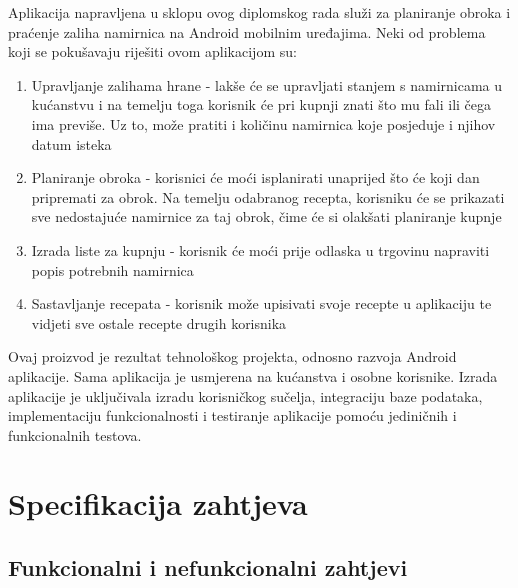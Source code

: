 \documentclass[diplomskirad]{fer}
\begin{document}
Aplikacija napravljena u sklopu ovog diplomskog rada služi za planiranje obroka i praćenje zaliha namirnica na Android mobilnim uređajima. Neki od problema koji se pokušavaju riješiti ovom aplikacijom su:
\begin{enumerate}
    \item Upravljanje zalihama hrane - lakše će se upravljati stanjem s namirnicama u kućanstvu i na temelju toga korisnik će pri kupnji znati što mu fali ili čega ima previše. Uz to, može pratiti i količinu namirnica koje posjeduje i njihov datum isteka
    \item Planiranje obroka - korisnici će moći isplanirati unaprijed što će koji dan pripremati za obrok. Na temelju odabranog recepta, korisniku će se prikazati sve nedostajuće namirnice za taj obrok, čime će si olakšati planiranje kupnje
    \item Izrada liste za kupnju - korisnik će moći prije odlaska u trgovinu napraviti popis potrebnih namirnica
    \item Sastavljanje recepata - korisnik može upisivati svoje recepte u aplikaciju te vidjeti sve ostale recepte drugih korisnika
\end{enumerate}

Ovaj proizvod je rezultat tehnološkog projekta, odnosno razvoja Android aplikacije. Sama aplikacija je usmjerena na kućanstva i osobne korisnike. Izrada aplikacije je uključivala izradu korisničkog sučelja, integraciju baze podataka, implementaciju funkcionalnosti i testiranje aplikacije pomoću jediničnih i funkcionalnih testova. 

\chapter{Specifikacija zahtjeva}
\section{Funkcionalni i nefunkcionalni zahtjevi}
\end{document}

